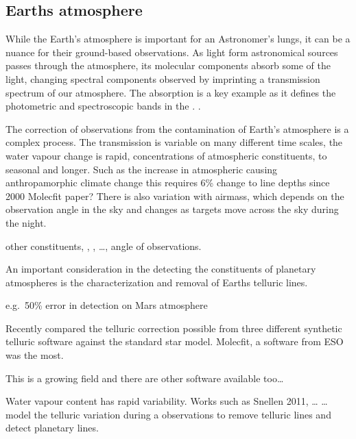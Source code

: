 \subsection{Earths atmosphere}
While the Earth's atmosphere is important for an Astronomer's lungs, it can be a nuance for their ground-based observations. As light form astronomical sources passes through the atmosphere, its molecular components absorb some of the light, changing spectral components observed  by imprinting a transmission spectrum of our atmosphere. The  absorption is a key example as it defines the photometric and spectroscopic bands in the \nir{}. .

The correction of observations from the contamination of Earth's atmosphere is a complex process. The transmission is variable on many different time scales, the water vapour change is rapid, concentrations of atmospheric constituents, to seasonal and longer. Such as the increase in atmospheric  causing anthropamorphic climate change this requires 6\% change to  line depths since 2000 Molecfit paper? There is also variation with airmass, which depends on the observation angle in the sky and changes as targets move across the sky during the night.

other constituents, , ,  \ldots{}, angle of observations.

An important consideration in the detecting the constituents of planetary atmospheres is the characterization and removal of Earths telluric lines.

e.g.\ 50\% error in  detection on Mars atmosphere


Recently \citet{ulmer-moll_telluric_2018} compared the telluric correction possible from three different synthetic telluric software against the standard star model. Molecfit, a software from ESO was the most.

This is a growing field and there are other software available too\ldots{}


Water vapour content has rapid variability. Works such as Snellen 2011, \ldots{} \ldots{}  model the telluric variation during a observations to remove telluric lines and detect planetary lines.



